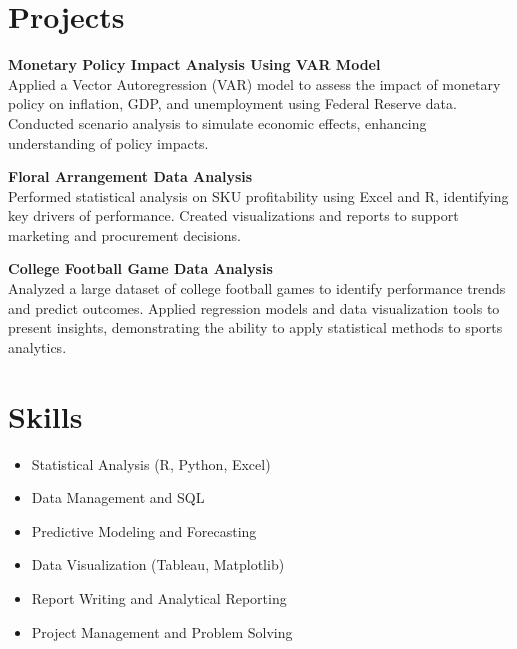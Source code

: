 \documentclass[10pt]{article}
\begin{document}
\section*{Projects}
\vspace{0pt}

\textbf{Monetary Policy Impact Analysis Using VAR Model} \\
Applied a Vector Autoregression (VAR) model to assess the impact of monetary policy on inflation, GDP, and unemployment using Federal Reserve data. Conducted scenario analysis to simulate economic effects, enhancing understanding of policy impacts.

\vspace{0pt}
\textbf{Floral Arrangement Data Analysis} \\
Performed statistical analysis on SKU profitability using Excel and R, identifying key drivers of performance. Created visualizations and reports to support marketing and procurement decisions.

\vspace{0pt}
\textbf{College Football Game Data Analysis} \\
Analyzed a large dataset of college football games to identify performance trends and predict outcomes. Applied regression models and data visualization tools to present insights, demonstrating the ability to apply statistical methods to sports analytics.

\vspace{-10pt}
\section*{Skills}
\vspace{0pt}
\begin{multicols}{2}
\begin{itemize}[noitemsep,nosep]
    \item Statistical Analysis (R, Python, Excel)
    \item Data Management and SQL
    \item Predictive Modeling and Forecasting
    \item Data Visualization (Tableau, Matplotlib)
    \item Report Writing and Analytical Reporting
    \item Project Management and Problem Solving
\end{itemize}
\end{multicols}
\end{document}
